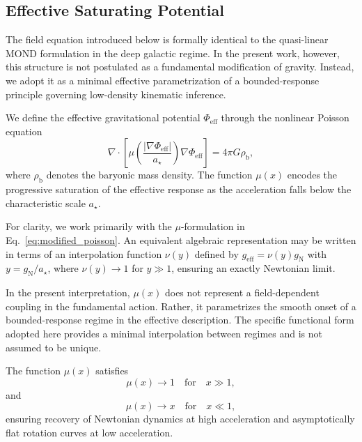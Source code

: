 \subsection{Effective Saturating Potential}
  \label{subsec:effective_potential}

  The field equation introduced below is formally identical to the
  quasi-linear MOND formulation in the deep galactic regime.
  In the present work, however, this structure is not postulated as a
  fundamental modification of gravity.
  Instead, we adopt it as a minimal effective parametrization of a
  bounded-response principle governing low-density kinematic inference.

  We define the effective gravitational potential $\Phi_{\mathrm{eff}}$ through
  the nonlinear Poisson equation
  \begin{equation}
    \nabla \cdot \left[
                   \mu\!\left( \frac{|\nabla \Phi_{\mathrm{eff}}|}{a_\star} \right)
                   \nabla \Phi_{\mathrm{eff}}
    \right]
    =
    4 \pi G \rho_{\mathrm{b}} ,
    \label{eq:modified_poisson}
  \end{equation}
  where $\rho_{\mathrm{b}}$ denotes the baryonic mass density.
  The function $\mu(x)$ encodes the progressive saturation of the effective
  response as the acceleration falls below the characteristic scale $a_\star$.

  For clarity, we work primarily with the $\mu$-formulation in
  Eq.~\eqref{eq:modified_poisson}.
  An equivalent algebraic representation may be written in terms of an
  interpolation function $\nu(y)$ defined by
  $g_{\mathrm{eff}} = \nu(y) g_{\mathrm{N}}$ with
  $y = g_{\mathrm{N}}/a_\star$,
  where $\nu(y) \rightarrow 1$ for $y \gg 1$,
  ensuring an exactly Newtonian limit.

  In the present interpretation, $\mu(x)$ does not represent a
  field-dependent coupling in the fundamental action.
  Rather, it parametrizes the smooth onset of a bounded-response regime
  in the effective description.
  The specific functional form adopted here provides a minimal
  interpolation between regimes and is not assumed to be unique.

  The function $\mu(x)$ satisfies
  \begin{equation}
    \mu(x) \rightarrow 1 \quad \text{for} \quad x \gg 1 ,
  \end{equation}
  and
  \begin{equation}
    \mu(x) \rightarrow x \quad \text{for} \quad x \ll 1 ,
  \end{equation}
  ensuring recovery of Newtonian dynamics at high acceleration
  and asymptotically flat rotation curves at low acceleration.

